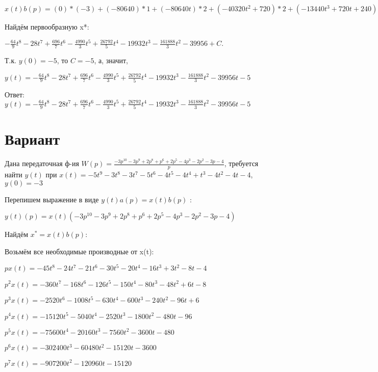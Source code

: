 \documentclass{article}
\begin{document}
{{{$x(t)b(p) = (0)*(-3)+(-80640)*1+(-80640t)*2+(-40320t^{2}+720)*2+(-13440t^{3}+720t+240)*(-2)+(-3360t^{4}+360t^{2}+240t-72)*3+(-672t^{5}+120t^{3}+120t^{2}-72t+12)*(-1)+(-112t^{6}+30t^{4}+40t^{3}-36t^{2}+12t+4)*2+(-16t^{7}+6t^{5}+10t^{4}-12t^{3}+6t^{2}+4t-3)*4+=-64t^{7}-224t^{6}+696t^{5}-9980t^{4}+26792t^{3}-79728t^{2}-161888t$





Найдём первообразную x*:

$-\frac{64}{9}t^{8}-28t^{7}+\frac{696}{7}t^{6}-\frac{4990}{3}t^{5}+\frac{26792}{5}t^{4}-19932t^{3}-\frac{161888}{3}t^{2}-39956+C.$

Т.к. $y(0)=-5$, то $C=-5$, а, значит, 

$y(t)=-\frac{64}{9}t^{8}-28t^{7}+\frac{696}{7}t^{6}-\frac{4990}{3}t^{5}+\frac{26792}{5}t^{4}-19932t^{3}-\frac{161888}{3}t^{2}-39956t-5$

Ответ: $y(t) = -\frac{64}{9}t^{8}-28t^{7}+\frac{696}{7}t^{6}-\frac{4990}{3}t^{5}+\frac{26792}{5}t^{4}-19932t^{3}-\frac{161888}{3}t^{2}-39956t-5$

\section{Вариант}

Дана передаточная ф-ия $W(p)=\frac{-3p^{10}-3p^{9}+2p^{8}+p^{6}+2p^{5}-4p^{3}-2p^{2}-3p-4}{p}$, требуется найти $y(t)$ при $x(t)=-5t^{9}-3t^{8}-3t^{7}-5t^{6}-4t^{5}-4t^{4}+t^{3}-4t^{2}-4t-4$, $y(0)=-3$

Перепишем выражение в виде $y(t)a(p)=x(t)b(p)$ :

$y(t)(p)=x(t)(-3p^{10}-3p^{9}+2p^{8}+p^{6}+2p^{5}-4p^{3}-2p^{2}-3p-4)$

Найдём $x^*=x(t)b(p)$:

Возьмём все необходимые производные от x(t):

$px(t)=-45t^{8}-24t^{7}-21t^{6}-30t^{5}-20t^{4}-16t^{3}+3t^{2}-8t-4$

$p^2x(t)=-360t^{7}-168t^{6}-126t^{5}-150t^{4}-80t^{3}-48t^{2}+6t-8$

$p^3x(t)=-2520t^{6}-1008t^{5}-630t^{4}-600t^{3}-240t^{2}-96t+6$

$p^4x(t)=-15120t^{5}-5040t^{4}-2520t^{3}-1800t^{2}-480t-96$

$p^5x(t)=-75600t^{4}-20160t^{3}-7560t^{2}-3600t-480$

$p^6x(t)=-302400t^{3}-60480t^{2}-15120t-3600$

$p^7x(t)=-907200t^{2}-120960t-15120$

}}}
\end{document}
